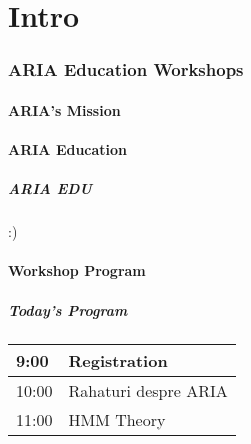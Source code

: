 \part{Intro}

\section{ARIA Education Workshops}
\label{sec:aria}


\subsection{ARIA's Mission}
\label{sec:arimamis}


\subsection{ARIA Education}
\label{sec:ae}


\begin{frame}
  \frametitle{ARIA EDU} :)
\end{frame}

\subsection{Workshop Program}
\label{sec:program}
\begin{frame}
  \frametitle{Today's Program}

  \begin{table}[h]
    \centering
    \begin{tabular}{|| l | l ||}
      \hline \hline
      9:00 & Registration \\
      \hline
      10:00 & Rahaturi despre ARIA \\
      \hline \hline
      11:00 & HMM Theory \\
      \hline \hline
      
    \end{tabular}
    \label{tab:program}
  \end{table}
\end{frame}
